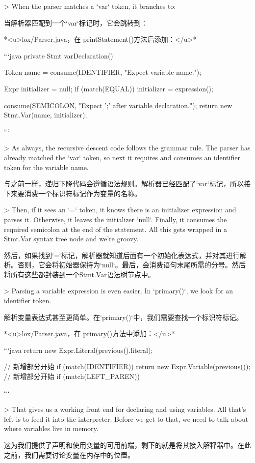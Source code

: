 \documentclass[cn,11pt,chinese]{elegantbook}
\begin{document}
{{{> When the parser matches a `var` token, it branches to:

当解析器匹配到一个`var`标记时，它会跳转到：

*<u>lox/Parser.java，在 printStatement()方法后添加：</u>*

```java
  private Stmt varDeclaration() {
    Token name = consume(IDENTIFIER, "Expect variable name.");

    Expr initializer = null;
    if (match(EQUAL)) {
      initializer = expression();
    }

    consume(SEMICOLON, "Expect ';' after variable declaration.");
    return new Stmt.Var(name, initializer);
  }
```

> As always, the recursive descent code follows the grammar rule. The parser has already matched the `var` token, so next it requires and consumes an identifier token for the variable name.

与之前一样，递归下降代码会遵循语法规则。解析器已经匹配了`var`标记，所以接下来要消费一个标识符标记作为变量的名称。

> Then, if it sees an `=` token, it knows there is an initializer expression and parses it. Otherwise, it leaves the initializer `null`. Finally, it consumes the required semicolon at the end of the statement. All this gets wrapped in a Stmt.Var syntax tree node and we’re groovy.

然后，如果找到`=`标记，解析器就知道后面有一个初始化表达式，并对其进行解析。否则，它会将初始器保持为`null`。最后，会消费语句末尾所需的分号。然后将所有这些都封装到一个Stmt.Var语法树节点中。

> Parsing a variable expression is even easier. In `primary()`, we look for an identifier token.

解析变量表达式甚至更简单。在`primary()`中，我们需要查找一个标识符标记。

*<u>lox/Parser.java，在 primary()方法中添加：</u>*

```java
      return new Expr.Literal(previous().literal);
    }
    // 新增部分开始
    if (match(IDENTIFIER)) {
      return new Expr.Variable(previous());
    }
    // 新增部分开始
    if (match(LEFT_PAREN)) {
```

> That gives us a working front end for declaring and using variables. All that’s left is to feed it into the interpreter. Before we get to that, we need to talk about where variables live in memory.

这为我们提供了声明和使用变量的可用前端，剩下的就是将其接入解释器中。在此之前，我们需要讨论变量在内存中的位置。

}}}
\end{document}
